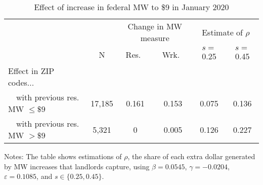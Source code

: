 \begin{table}[h!]
    \centering
    \caption{Effect of increase in federal MW to \$9 in January 2020}
    \label{tab:counterfactuals_fed_9usd}

    \begin{tabular}{@{}lccccc@{}}
        \toprule
                            &   & \multicolumn{2}{c}{Change in MW measure}
                                & \multicolumn{2}{c}{Estimate of $\rho$}                  \\ \cmidrule(lr){3-4} \cmidrule(l){5-6}
                            & N & Res.\ & Wrk.\ & $s = $ 0.25  & $s = $ 0.45                 \\ \midrule
        Effect in ZIP codes...                         &      &       &       &     &      \\
        $\quad$with previous res. MW $\leq\$9\quad$    & 17,185 &  0.161  &  0.153  & 0.075 &  0.136 \\
        $\quad$with previous res. MW $>\$9\quad$       & 5,321 &  0  &  0.005  & 0.126 & 0.227 \\ \bottomrule
    \end{tabular}
    
    \begin{minipage}{.95\textwidth} \footnotesize
        \vspace{2mm}
        Notes: The table shows estimations of $\rho$, the share of each extra dollar generated 
        by MW increases that landlords capture, using $\beta = 0.0545$, $\gamma = -0.0204$, 
        $\varepsilon = 0.1085$, and $s\in\{0.25, 0.45\}$.
    \end{minipage}
\end{table}